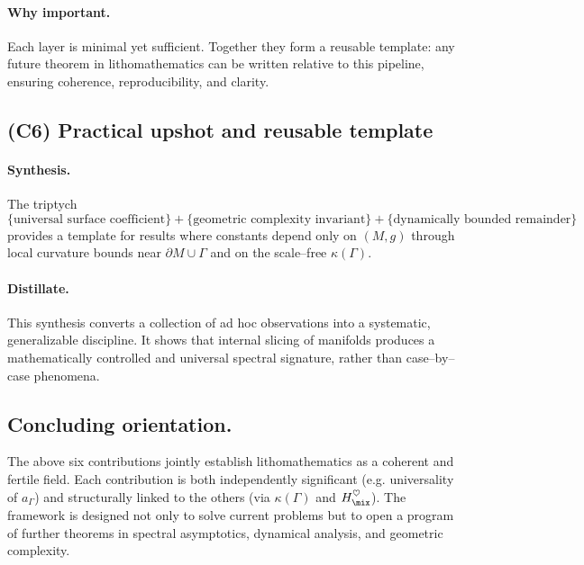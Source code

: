 \paragraph{Why important.}
Each layer is minimal yet sufficient. Together they form a reusable template:
any future theorem in lithomathematics can be written relative to this pipeline, 
ensuring coherence, reproducibility, and clarity. 

\subsection{(C6) Practical upshot and reusable template}

\paragraph{Synthesis.}
The triptych
\[
\{\text{universal surface coefficient}\} 
+ \{\text{geometric complexity invariant}\} 
+ \{\text{dynamically bounded remainder}\}
\]
provides a template for results where constants depend only on $(M,g)$ through 
local curvature bounds near $\partial M\cup\Gamma$ and on the scale–free $\kappa(\Gamma)$. 

\paragraph{Distillate.}
This synthesis converts a collection of ad hoc observations into a systematic, 
generalizable discipline. 
It shows that internal slicing of manifolds produces a mathematically controlled 
and universal spectral signature, rather than case–by–case phenomena.

\subsection{Concluding orientation.}

The above six contributions jointly establish lithomathematics as a coherent and fertile field.
Each contribution is both independently significant (e.g. universality of $a_\Gamma$) 
and structurally linked to the others (via $\kappa(\Gamma)$ and $H_{\mix}^\heartsuit$). 
The framework is designed not only to solve current problems but to open a program of further theorems 
in spectral asymptotics, dynamical analysis, and geometric complexity. 



